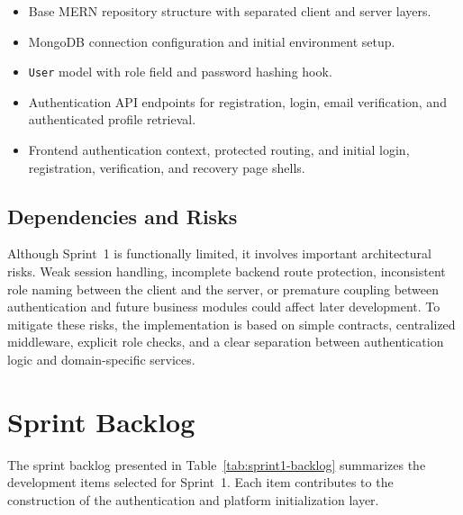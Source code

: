\documentclass[a4paper,12pt]{report}
\begin{document}
\begin{itemize}[leftmargin=*]
  \item[--] Base MERN repository structure with separated client and server layers.
  \item[--] MongoDB connection configuration and initial environment setup.
  \item[--] \texttt{User} model with role field and password hashing hook.
  \item[--] Authentication API endpoints for registration, login, email verification, and authenticated profile retrieval.
  \item[--] Frontend authentication context, protected routing, and initial login, registration, verification, and recovery page shells.
\end{itemize}

\subsection{Dependencies and Risks}

Although Sprint~1 is functionally limited, it involves important architectural risks. Weak session handling, incomplete backend route protection, inconsistent role naming between the client and the server, or premature coupling between authentication and future business modules could affect later development. To mitigate these risks, the implementation is based on simple contracts, centralized middleware, explicit role checks, and a clear separation between authentication logic and domain-specific services.

\section{Sprint Backlog}
\label{sec:sprint1-backlog}

The sprint backlog presented in Table~\ref{tab:sprint1-backlog} summarizes the development items selected for Sprint~1. Each item contributes to the construction of the authentication and platform initialization layer.
\end{document}
